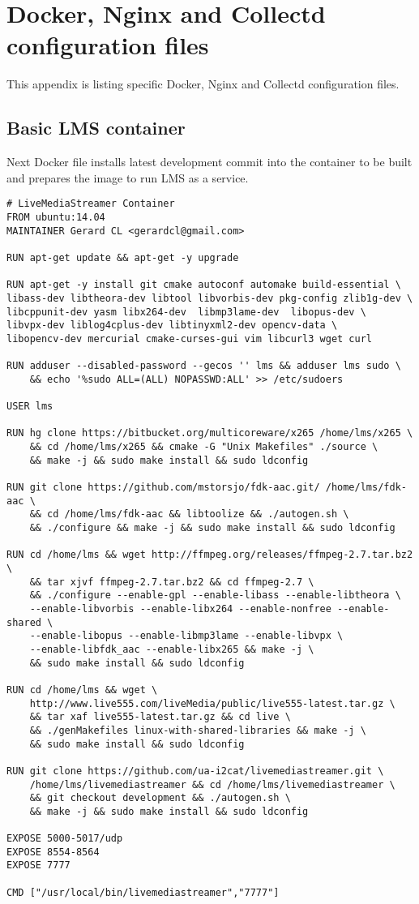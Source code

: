 \chapter{Docker, Nginx and Collectd configuration files}\label{ANX:dockerFiles}

This appendix is listing specific Docker, Nginx and Collectd configuration files.

\section{Basic LMS container}\label{ANX:dockerFiles1}

Next Docker file installs latest development commit into the container to be built and prepares the image to run LMS as a service.

\begin{verbatim}
# LiveMediaStreamer Container
FROM ubuntu:14.04
MAINTAINER Gerard CL <gerardcl@gmail.com>

RUN apt-get update && apt-get -y upgrade

RUN apt-get -y install git cmake autoconf automake build-essential \ 
libass-dev libtheora-dev libtool libvorbis-dev pkg-config zlib1g-dev \
libcppunit-dev yasm libx264-dev  libmp3lame-dev  libopus-dev \
libvpx-dev liblog4cplus-dev libtinyxml2-dev opencv-data \
libopencv-dev mercurial cmake-curses-gui vim libcurl3 wget curl 

RUN adduser --disabled-password --gecos '' lms && adduser lms sudo \
	&& echo '%sudo ALL=(ALL) NOPASSWD:ALL' >> /etc/sudoers

USER lms

RUN hg clone https://bitbucket.org/multicoreware/x265 /home/lms/x265 \
	&& cd /home/lms/x265 && cmake -G "Unix Makefiles" ./source \
	&& make -j && sudo make install && sudo ldconfig

RUN git clone https://github.com/mstorsjo/fdk-aac.git/ /home/lms/fdk-aac \
	&& cd /home/lms/fdk-aac && libtoolize && ./autogen.sh \
	&& ./configure && make -j && sudo make install && sudo ldconfig

RUN cd /home/lms && wget http://ffmpeg.org/releases/ffmpeg-2.7.tar.bz2 \
	&& tar xjvf ffmpeg-2.7.tar.bz2 && cd ffmpeg-2.7 \
	&& ./configure --enable-gpl --enable-libass --enable-libtheora \
	--enable-libvorbis --enable-libx264 --enable-nonfree --enable-shared \
	--enable-libopus --enable-libmp3lame --enable-libvpx \
	--enable-libfdk_aac --enable-libx265 && make -j \
	&& sudo make install && sudo ldconfig

RUN cd /home/lms && wget \
	http://www.live555.com/liveMedia/public/live555-latest.tar.gz \
	&& tar xaf live555-latest.tar.gz && cd live \
	&& ./genMakefiles linux-with-shared-libraries && make -j \
	&& sudo make install && sudo ldconfig

RUN git clone https://github.com/ua-i2cat/livemediastreamer.git \
	/home/lms/livemediastreamer && cd /home/lms/livemediastreamer \
	&& git checkout development && ./autogen.sh \
	&& make -j && sudo make install && sudo ldconfig

EXPOSE 5000-5017/udp
EXPOSE 8554-8564
EXPOSE 7777

CMD ["/usr/local/bin/livemediastreamer","7777"] 
\end{verbatim}

